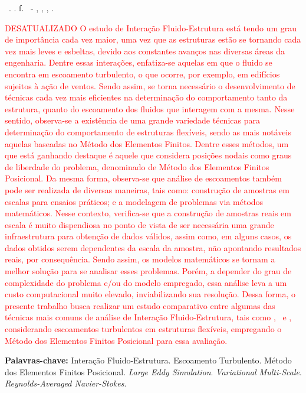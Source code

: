\setlength{\absparsep}{18pt} %
\begin{resumo}
  \begin{flushleft}
    \setlength{\absparsep}{0pt} %
    \SingleSpacing
    \Autorabr\ \textbf{\Titulo}.	\the\year. \pageref{LastPage}f.
    \Tipotrabalho\ - \Unidademin, \Universidade, \Local, \the\year.
  \end{flushleft}
  \OnehalfSpacing

  \textcolor{red}{
    DESATUALIZADO
    O estudo de Interação Fluido-Estrutura está tendo um grau de importância cada vez maior, uma vez que as estruturas estão se tornando cada vez mais leves e esbeltas, devido aos constantes avanços nas diversas áreas da engenharia. Dentre essas interações, enfatiza-se aquelas em que o fluido se encontra em escoamento turbulento, o que ocorre, por exemplo, em edifícios sujeitos à ação de ventos. Sendo assim, se torna necessário o desenvolvimento de técnicas cada vez mais eficientes na determinação do comportamento tanto da estrutura, quanto do escoamento dos fluidos que interagem com a mesma. Nesse sentido, observa-se a existência de uma grande variedade técnicas para determinação do comportamento de estruturas flexíveis, sendo as mais notáveis aquelas baseadas no Método dos Elementos Finitos. Dentre esses métodos, um que está ganhando destaque é aquele que considera posições nodais como graus de liberdade do problema, denominado de Método dos Elementos Finitos Posicional. Da mesma forma, observa-se que análise de escoamentos também pode ser realizada de diversas maneiras, tais como: construção de amostras em escalas para ensaios práticos; e a modelagem de problemas via métodos matemáticos. Nesse contexto, verifica-se que a construção de amostras reais em escala é muito dispendiosa no ponto de vista de ser necessária uma grande infraestrutura para obtenção de dados válidos, assim como, em alguns casos, os dados obtidos serem dependentes da escala da amostra, não apontando resultados reais, por consequência. Sendo assim, os modelos matemáticos se tornam a melhor solução para se analisar esses problemas. Porém, a depender do grau de complexidade do problema e/ou do modelo empregado, essa análise leva a um custo computacional muito elevado, inviabilizando sua resolução. Dessa forma, o presente trabalho busca realizar um estudo comparativo entre algumas das técnicas mais comuns de análise de Interação Fluido-Estrutura, tais como \RANS, \LES\ e \VMS, considerando escoamentos turbulentos em estruturas flexíveis, empregando o Método dos Elementos Finitos Posicional para essa avaliação.}

  \textbf{Palavras-chave:} Interação Fluido-Estrutura. Escoamento Turbulento. Método dos Elementos Finitos Posicional. \textit{Large Eddy Simulation}. \textit{Variational Multi-Scale}. \textit{Reynolds-Averaged Navier-Stokes}.
\end{resumo}
